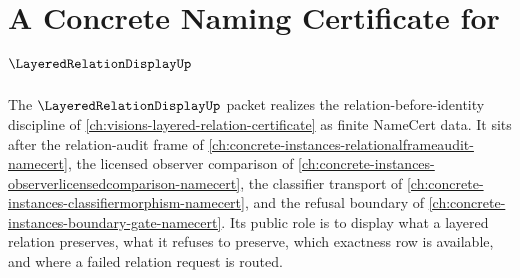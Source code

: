 \chapter{A Concrete Naming Certificate for $\LayeredRelationDisplayUp$}
\label{ch:concrete-instances-layeredrelationdisplay-namecert}

The $\LayeredRelationDisplayUp$ packet realizes the relation-before-identity discipline of \autoref{ch:visions-layered-relation-certificate} as finite NameCert data. It sits after the relation-audit frame of \autoref{ch:concrete-instances-relationalframeaudit-namecert}, the licensed observer comparison of \autoref{ch:concrete-instances-observerlicensedcomparison-namecert}, the classifier transport of \autoref{ch:concrete-instances-classifiermorphism-namecert}, and the refusal boundary of \autoref{ch:concrete-instances-boundary-gate-namecert}. Its public role is to display what a layered relation preserves, what it refuses to preserve, which exactness row is available, and where a failed relation request is routed.

